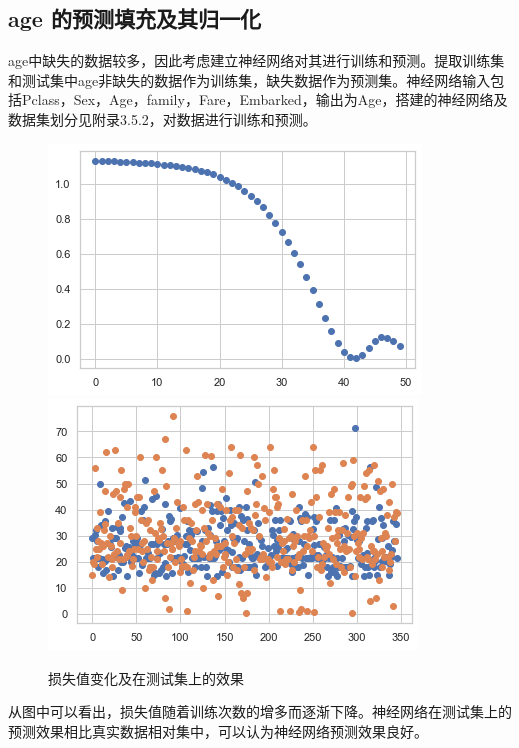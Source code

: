 \subsection{age 的预测填充及其归一化}
age中缺失的数据较多，因此考虑建立神经网络对其进行训练和预测。提取训练集和测试集中age非缺失的数据作为训练集，缺失数据作为预测集。神经网络输入包括Pclass，Sex，Age，family，Fare，Embarked，输出为Age，搭建的神经网络及数据集划分见附录3.5.2，对数据进行训练和预测。
\begin{figure}[H]
	\centering
	\includegraphics[scale=0.5,angle=0]{images/13.png}	\includegraphics[scale=0.5,angle=0]{images/14.png}
	\caption{损失值变化及在测试集上的效果}
	\label{13}
\end{figure}
从图中可以看出，损失值随着训练次数的增多而逐渐下降。神经网络在测试集上的预测效果相比真实数据相对集中，可以认为神经网络预测效果良好。
